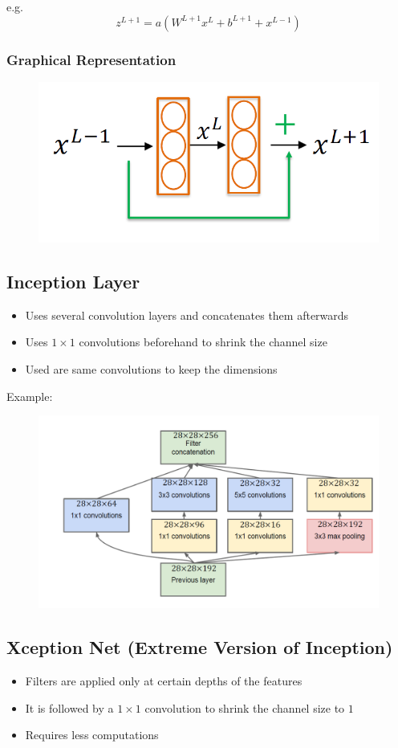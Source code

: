 \documentclass[10pt,a4paper]{article}
\newcommand{\pros}{\textcolor{green}{\textbf{+}}}
\newcommand{\props}{$\circ$}
\newcommand{\ipros}{\item[\pros]}
\newcommand{\iprops}{\item[\props]}
\begin{document}
e.g. \\
$$
	z^{L + 1} = a(W^{L + 1} x^L + b^{L + 1} + x^{L - 1})
$$

\subsubsection{Graphical Representation}
\begin{figure}[H]
	\includegraphics[width=0.5\columnwidth]{figures/res_block.png}
\end{figure}

\subsection{Inception Layer}
\begin{itemize}
	\item Uses several convolution layers and concatenates them afterwards
	\item Uses $1 \times 1$ convolutions beforehand to shrink the channel size 
	\iprops Used are same convolutions to keep the dimensions
\end{itemize}

Example: \\
\begin{figure}[H]
	\includegraphics[width=0.7\columnwidth]{figures/inception_layer.png}
\end{figure}

\subsection{Xception Net (Extreme Version of Inception)}
\begin{itemize}
	\item Filters are applied only at certain depths of the features
	\item It is followed by a $1 \times 1$ convolution to shrink the channel size to $1$
	\ipros Requires less computations
\end{itemize}
\end{document}
